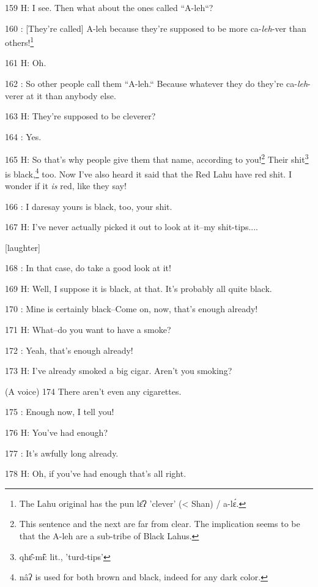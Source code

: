 159 H: I see. Then what about the ones called ``A-leh``?

160  : [They're called] A-leh because they're supposed to be more ca-\textit{leh}-ver
than others!\footnote{The Lahu original has the pun lɛ̂ʔ 'clever' (< Shan) / a-lɛ́.}

161 H: Oh.

162  : So other people call them ``A-leh.`` Because whatever they
do they're ca-\textit{leh}-verer at it than anybody else.

163 H: They're supposed to be cleverer?

164  : Yes.

165 H: So that's why people give them that name, according to you!\footnote{This sentence and the next are far from clear. The implication seems to be that the A-leh are a sub-tribe of Black Lahus.} Their shit\footnote{qhɛ̂-mɨ̂: lit., 'turd-tips'}
is black,\footnote{nâʔ is used for both brown and black, indeed for any dark color.} too. Now I've also heard it said that the Red Lahu have red shit.
I wonder if it \textit{is }red, like they say!

166  : I daresay yours is black, too, your shit.

167  H: I've never actually picked it out to look at it--my shit-tips....

[laughter]

168  : In that case, do take a good look at it!

169 H: Well, I suppose it is black, at that. It's probably all quite black.

170  : Mine is certainly black--Come on, now, that's enough already!

171 H: What--do you want to have a smoke?

172  : Yeah, that's enough already!

173 H: I've already smoked a big cigar. Aren't you smoking?

(A voice) 174 There aren't even any cigarettes.

175  : Enough now, I tell you!

176 H: You've had enough?

177  : It's awfully long already.

178 H: Oh, if you've had enough that's all right.

